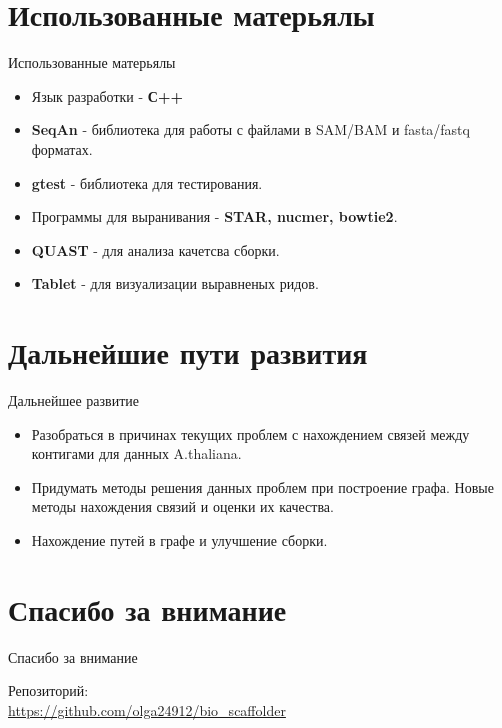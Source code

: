 \documentclass{beamer}
\newcommand{\cimg}[2]{%
	\begin{center}%
		\ifthenelse{\equal{#2}{}}{%
			\texttt{[image: \#1]}
		}{%
			\texttt{[image: \#1]}
		}%
	\end{center}%
}
\begin{document}
\section{Использованные матерьялы}
\begin{frame}[t]{Использованные матерьялы}
\begin{itemize}
	\item Язык разработки - \textbf{С++}
	\item \textbf{SeqAn} - библиотека для работы с 
	файлами в SAM/BAM и fasta/fastq форматах.  
	\item \textbf{gtest} - библиотека для тестирования.
	\item Программы для выранивания - \textbf{STAR, nucmer, bowtie2}. 
	\item \textbf{QUAST} - для анализа качетсва сборки. 
	\item \textbf{Tablet} - для визуализации выравненых ридов. 
\end{itemize}
\end{frame}

\section{Дальнейшие пути развития}
\begin{frame}[t]{Дальнейшее развитие}
\begin{itemize}
\item Разобраться в причинах текущих 
проблем с нахождением связей между 
контигами для данных A.thaliana.  
\cimg{athaliana.jpg}{0.20}
\item Придумать методы решения данных проблем при построение графа. Новые методы нахождения связий и оценки их качества. 
\item Нахождение путей в графе и улучшение сборки. 
\end{itemize}
\end{frame}

\section{Спасибо за внимание}
\begin{frame}{Спасибо за внимание}
    \begin{center}
        Репозиторий: \\ \url{https://github.com/olga24912/bio_scaffolder}
    \end{center}
\end{frame}
\end{document}
